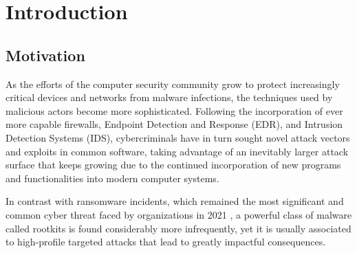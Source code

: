 \chapter{Introduction}
\section{Motivation} \label{section:motivation}

As the efforts of the computer security community grow to protect
increasingly critical devices and networks from malware infections, the
techniques used by malicious actors become more sophisticated.  Following
the incorporation of ever more capable firewalls, Endpoint Detection and
Response (EDR), and Intrusion Detection Systems (IDS), cybercriminals have
in turn sought novel attack vectors and exploits in common software, taking
advantage of an inevitably larger attack surface that keeps growing due to
the continued incorporation of new programs and functionalities into modern
computer systems.

In contrast with ransomware incidents, which remained the most significant
and common cyber threat faced by organizations in 2021
\cite{ransomware_pwc}, a powerful class of malware called rootkits is found
considerably more infrequently, yet it is usually associated to
high-profile targeted attacks that lead to greatly impactful consequences.

